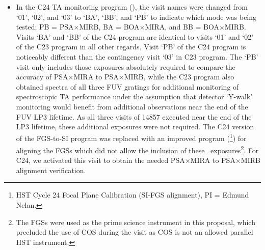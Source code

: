 \begin{itemize}
{Some exposures were slightly lengthened to take advantage of the increased efficiency of the modified OSM2 home position.\footnote{The OSM2 home position was changed from G185M to MIRA on July 6, 2015 (2015.157).}
The contingency visit (`03') was not executed in C23.
}
\item{
In the C24 TA monitoring program (), the visit names were changed from
`01', `02', and `03' to `BA', `BB', and `PB' to indicate which 
mode was being tested; PB = PSA$\times$MIRB, BA = BOA$\times$MIRA, and BB = BOA$\times$MIRB.
Visits `BA' and `BB' of the C24 program are identical to visits `01' and `02' of the C23 program in all other regards.
Visit `PB' of the C24 program is noticeably different than the contingency visit `03' in C23 program.
The `PB' visit only includes those exposures absolutely required to compare the  accuracy of PSA$\times$MIRA to PSA$\times$MIRB, while the C23 program also obtained spectra of all three FUV gratings for additional monitoring of spectroscopic TA performance under the assumption that detector `Y-walk' monitoring would benefit from additional observations near the end of the FUV LP3 lifetime.
As all three visits of 14857 executed near the end of the LP3 lifetime, these additional exposures were not required.
The C24 version of the FGS-to-SI program was replaced with an improved program (\footnote{HST Cycle 24 Focal Plane Calibration (SI-FGS alignment), PI = Edmund Nelan.}) for aligning the FGSs which did not allow the inclusion of these ~exposures\footnote{The FGSs were used as the prime science instrument in this proposal, which precluded the use of COS during the visit as COS is not an allowed parallel HST instrument.}.
For C24, we activated this visit to obtain the needed PSA$\times$MIRA to PSA$\times$MIRB  alignment verification.
}
\end{itemize}
